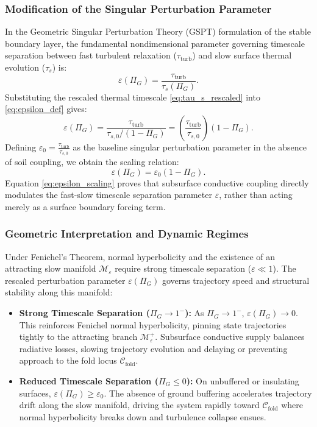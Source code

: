 \documentclass[11pt]{article}
\begin{document}
\subsubsection{Modification of the Singular Perturbation Parameter}
In the Geometric Singular Perturbation Theory (GSPT) formulation of the stable boundary layer, the fundamental nondimensional parameter governing timescale separation between fast turbulent relaxation ($\tau_{\text{turb}}$) and slow surface thermal evolution ($\tau_s$) is:
\begin{equation}
\varepsilon(\Pi_G) = \frac{\tau_{\text{turb}}}{\tau_s(\Pi_G)}.
\label{eq:epsilon_def}
\end{equation}
Substituting the rescaled thermal timescale \eqref{eq:tau_s_rescaled} into \eqref{eq:epsilon_def} gives:
\begin{equation}
\varepsilon(\Pi_G) = \frac{\tau_{\text{turb}}}{\tau_{s,0} / (1 - \Pi_G)} = \left( \frac{\tau_{\text{turb}}}{\tau_{s,0}} \right) (1 - \Pi_G).
\label{eq:epsilon_derivation}
\end{equation}
Defining $\varepsilon_0 = \frac{\tau_{\text{turb}}}{\tau_{s,0}}$ as the baseline singular perturbation parameter in the absence of soil coupling, we obtain the scaling relation:
\begin{equation}
\varepsilon(\Pi_G) = \varepsilon_0 (1 - \Pi_G).
\label{eq:epsilon_scaling}
\end{equation}
Equation \eqref{eq:epsilon_scaling} proves that subsurface conductive coupling directly modulates the fast-slow timescale separation parameter $\varepsilon$, rather than acting merely as a surface boundary forcing term.

\subsubsection{Geometric Interpretation and Dynamic Regimes}
Under Fenichel's Theorem, normal hyperbolicity and the existence of an attracting slow manifold $\mathcal{M}_\varepsilon$ require strong timescale separation ($\varepsilon \ll 1$). The rescaled perturbation parameter $\varepsilon(\Pi_G)$ governs trajectory speed and structural stability along this manifold:
\begin{itemize}
    \item \textbf{Strong Timescale Separation ($\Pi_G \to 1^-$):} As $\Pi_G \to 1^-$, $\varepsilon(\Pi_G) \to 0$. This reinforces Fenichel normal hyperbolicity, pinning state trajectories tightly to the attracting branch $\mathcal{M}_\varepsilon^+$. Subsurface conductive supply balances radiative losses, slowing trajectory evolution and delaying or preventing approach to the fold locus $\mathcal{C}_{\text{fold}}$.
    \item \textbf{Reduced Timescale Separation ($\Pi_G \le 0$):} On unbuffered or insulating surfaces, $\varepsilon(\Pi_G) \ge \varepsilon_0$. The absence of ground buffering accelerates trajectory drift along the slow manifold, driving the system rapidly toward $\mathcal{C}_{\text{fold}}$ where normal hyperbolicity breaks down and turbulence collapse ensues.
\end{itemize}
\end{document}
